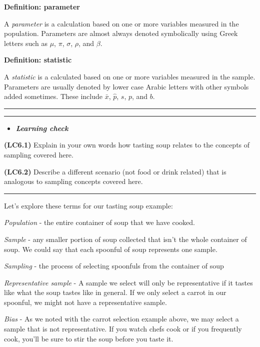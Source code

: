 \documentclass[]{tufte-book}
\let\oldrule=\rule
\renewcommand{\rule}[1]{\oldrule{\linewidth}}
\newenvironment{rmdblock}[1]
  {\begin{shaded*}
  \begin{itemize}
  \renewcommand{\labelitemi}{
    \raisebox{-.7\height}[0pt][0pt]{
    }
  }
  \item
  }
  {
  \end{itemize}
  \end{shaded*}
  }
\newenvironment{learncheck}
  {\begin{rmdblock}{warning}}
  {\end{rmdblock}}
\theoremstyle{definition}
\theoremstyle{definition}
\theoremstyle{remark}
\begin{document}
\textbf{Definition: parameter}

A \emph{parameter} is a calculation based on one or more variables
measured in the population. Parameters are almost always denoted
symbolically using Greek letters such as \(\mu\), \(\pi\), \(\sigma\),
\(\rho\), and \(\beta\).

\textbf{Definition: statistic}

A \emph{statistic} is a calculated based on one or more variables
measured in the sample. Parameters are usually denoted by lower case
Arabic letters with other symbols added sometimes. These include
\(\bar{x}\), \(\hat{p}\), \(s\), \(p\), and \(b\).

\begin{center}\rule{0.5\linewidth}{\linethickness}\end{center}

\begin{center}\rule{0.5\linewidth}{\linethickness}\end{center}

\begin{learncheck}
\textbf{\emph{Learning check}}
\end{learncheck}

\textbf{(LC6.1)} Explain in your own words how tasting soup relates to
the concepts of sampling covered here.

\textbf{(LC6.2)} Describe a different scenario (not food or drink
related) that is analogous to sampling concepts covered here.

\begin{center}\rule{0.5\linewidth}{\linethickness}\end{center}

Let's explore these terms for our tasting soup example:

\emph{Population} - the entire container of soup that we have cooked.

\emph{Sample} - any smaller portion of soup collected that isn't the
whole container of soup. We could say that each spoonful of soup
represents one sample.

\emph{Sampling} - the process of selecting spoonfuls from the container
of soup

\emph{Representative sample} - A sample we select will only be
representative if it tastes like what the soup tastes like in general.
If we only select a carrot in our spoonful, we might not have a
representative sample.

\emph{Bias} - As we noted with the carrot selection example above, we
may select a sample that is not representative. If you watch chefs cook
or if you frequently cook, you'll be sure to stir the soup before you
taste it.
\end{document}
